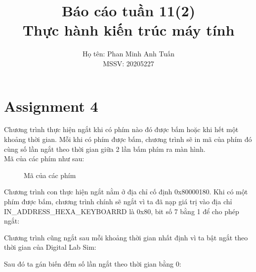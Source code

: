 \documentclass[a4paper,12pt]{article}
\title{\textbf{Báo cáo tuần 11(2) \\ Thực hành kiến trúc máy tính}}
\author{Họ tên: Phan Minh Anh Tuấn \\ MSSV: 20205227}
\date{}
\begin{document}
	\maketitle
	\tableofcontents
	\newpage
	\section{Assignment 4}
	Chương trình thực hiện ngắt khi có phím nào đó được bấm hoặc khi hết một khoảng thời gian. Mỗi khi có phím được bấm, chương trình sẽ in mã của phím đó cùng số lần ngắt theo thời gian giữa 2 lần bấm phím ra màn hình. \\
	Mã của các phím như sau:
	\FloatBarrier
	\begin{figure}[ht!]
		\centerline{}
		\caption{Mã của các phím}
		\label{fig:ass1}
	\end{figure}
	\noindent
Chương trình con thực hiện ngắt nằm ở địa chỉ cố định 0x80000180. Khi có một phím được bấm, chương trình chính sẽ ngắt vì ta đã nạp giá trị vào địa chỉ IN\_ADDRESS\_HEXA\_KEYBOARRD là 0x80, bit số 7 bằng 1 để cho phép ngắt:
\FloatBarrier
\begin{figure}[ht!]
	\centerline{}
	\caption*{}
	\label{fig:ass1}
\end{figure}
\clearpage
\noindent
Chương trình cũng ngắt sau mỗi khoảng thời gian nhất định vì ta bật ngắt theo thời gian của Digital Lab Sim:
\FloatBarrier
\begin{figure}[ht!]
	\centerline{}
	\caption*{}
	\label{fig:ass1}
\end{figure}
\noindent
Sau đó ta gán biến đếm số lần ngắt theo thời gian bằng 0:
\end{document}
